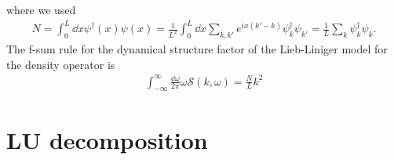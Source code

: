 \documentclass[11pt, a4paper]{report} %
\begin{document}
where we used 
\begin{align}
  \label{eq:6}
  N = \int_0^{L} \dd x \psi^{\dagger}(x) \psi(x)
    = \frac{1}{L^2} \int_{0}^L \dd x \sum_{k,k'} e^{ix(k'-k)} \psi_k^{\dag} \psi_{k'}
    = \frac{1}{L} \sum_k \psi^{\dag}_k \psi_k .
\end{align}
The f-sum rule for the dynamical structure factor of the Lieb-Liniger model for the density operator is
\begin{align}
  \label{eq:16}
  \int_{-\infty}^{\infty} \frac{\dd \omega}{2\pi} \omega \mathcal{S}(k, \omega) = \frac{N}{L}k^2
\end{align}

\chapter{LU decomposition}\label{app:ludecomp}




\end{document}

